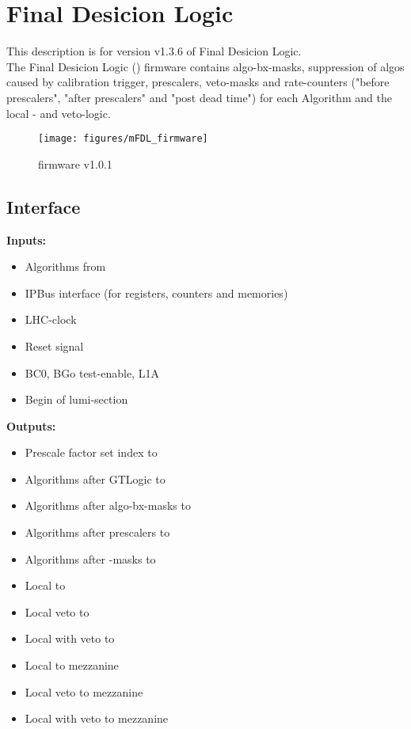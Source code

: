 \section{Final Desicion Logic}\label{sec:fdl:ufdl}

This description is for version v1.3.6 of Final Desicion Logic.\\

The Final Desicion Logic (\ufdl) firmware contains algo-bx-masks, suppression of algos caused by calibration trigger, prescalers, veto-masks and rate-counters
("before prescalers", "after prescalers" and "post dead time") for each Algorithm and the local \finor- and veto-logic.

\begin{figure}[htb]
\centering
\texttt{[image: figures/mFDL\_firmware]}
\caption{\ufdl firmware v1.0.1}
\label{fig:fdl:mFDL_firmware}
\end{figure}

\subsection{\ufdl Interface}
\label{sec:fdl:ufdl_interface}


\textbf{Inputs:}
\begin{itemize}
\item Algorithms from \ugtl
\item IPBus interface (for registers, counters and memories)
\item LHC-clock
\item Reset signal
\item BC0, BGo test-enable, L1A
\item Begin of lumi-section
\end{itemize}
\textbf{Outputs:}
\begin{itemize}
\item Prescale factor set index to \rop
\item Algorithms after GTLogic to \rop
\item Algorithms after algo-bx-masks to \rop
\item Algorithms after prescalers to \rop
\item Algorithms after \finor-masks to \rop
\item Local \finor to \rop
\item Local veto to \rop
\item Local \finor with veto to \rop
\item Local \finor to mezzanine
\item Local veto to mezzanine
\item Local \finor with veto to mezzanine
\end{itemize}


